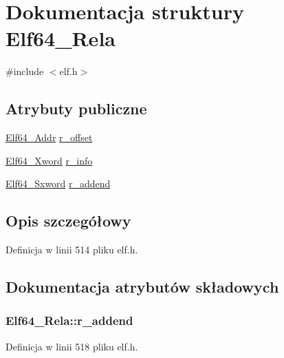 \hypertarget{struct_elf64___rela}{\section{Dokumentacja struktury Elf64\-\_\-\-Rela}
\label{struct_elf64___rela}
}


{\ttfamily \#include $<$elf.\-h$>$}

\subsection*{Atrybuty publiczne}
\begin{DoxyCompactItemize}
\item 
\hyperlink{elf_8h_aeed51d08e3a950d637f8ec1f0cd4ef65}{Elf64\-\_\-\-Addr} \hyperlink{struct_elf64___rela_a9ea7e07ec6e0d57bf4bcd53b89de7948}{r\-\_\-offset}
\item 
\hyperlink{elf_8h_a5447a48a3dae0bd24f606415268c6fe4}{Elf64\-\_\-\-Xword} \hyperlink{struct_elf64___rela_aeab8bc0f9035184127ec02d947bf2c76}{r\-\_\-info}
\item 
\hyperlink{elf_8h_a5b450442210b3d21567662fb96ac9a02}{Elf64\-\_\-\-Sxword} \hyperlink{struct_elf64___rela_a04358b55027a7dcc414e221d916aac64}{r\-\_\-addend}
\end{DoxyCompactItemize}


\subsection{Opis szczegółowy}


Definicja w linii 514 pliku elf.\-h.



\subsection{Dokumentacja atrybutów składowych}
\hypertarget{struct_elf64___rela_a04358b55027a7dcc414e221d916aac64}{
\subsubsection[{r\-\_\-addend}]{ Elf64\-\_\-\-Rela\-::r\-\_\-addend}}\label{struct_elf64___rela_a04358b55027a7dcc414e221d916aac64}


Definicja w linii 518 pliku elf.\-h.

